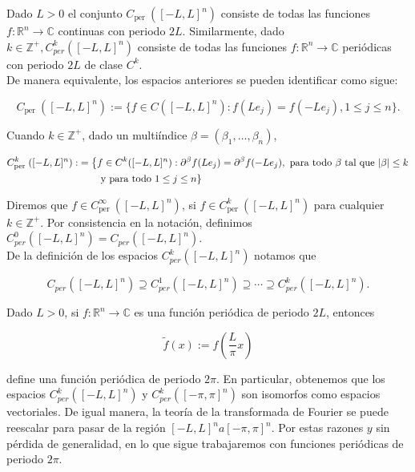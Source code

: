 \documentclass[12pt]{article}
\begin{document}
\begin{note}
    Dado $L>0$ el conjunto $C_{\text {per }}([-L, L]^n)$ consiste de todas las funciones $f: \mathbb{R}^n \rightarrow \mathbb{C}$ continuas con periodo $2L$. Similarmente, dado $k \in \mathbb{Z}^{+}, C_{p e r}^k([-L, L]^n)$ consiste de todas las funciones $f: \mathbb{R}^n \rightarrow \mathbb{C}$ periódicas con periodo $2 L$ de clase $C^k$.\\

De manera equivalente, los espacios anteriores se pueden identificar como sigue:

$$
C_{\text {per }}([-L, L]^n):=\{f \in C([-L, L]^n): f(Le_j)=f(-Le_j), 1\leq j\leq n\}.
$$


Cuando $k \in \mathbb{Z}^{+}$, dado un multiíndice $\beta=(\beta_1,\ldots,\beta_n)$,

\begin{align*}
    C_{\text {per }}^k([-L, L]^n):&=\left\{f \in C^k([-L, L]^n): \partial^{\beta}f(Le_j)=\partial^{\beta}f(-Le_j), \text{ para todo } \beta \text{ tal que } |\beta|\leq k\right. \\
    &\hspace{0.8cm} \text{y para todo } 1\leq j\leq n\}
\end{align*}

Diremos que $f \in C_{\text {per }}^{\infty}([-L, L]^n)$, si $f \in C_{\text {per }}^k([-L, L]^n)$ para cualquier $k \in \mathbb{Z}^{+}$. Por consistencia en la notación, definimos $C_{p e r}^0([-L, L]^n)=C_{p e r}([-L, L]^n)$.\\

De la definición de los espacios $C_{p e r}^k([-L, L]^n)$ notamos que

$$
C_{p e r}([-L, L]^n) \supseteq C_{p e r}^1([-L, L]^n) \supseteq \cdots \supseteq C_{p e r}^k([-L, L]^n).
$$

\end{note}

Dado $L>0$, si $f: \mathbb{R}^n \rightarrow \mathbb{C}$ es una función periódica de periodo $2 L$, entonces

$$
\widetilde{f}(x):=f\left(\frac{L}{\pi} x\right)
$$

define una función periódica de periodo $2 \pi$. En particular, obtenemos que los espacios $C_{p e r}^k([-L, L]^n)$ y $C_{p e r}^k([-\pi, \pi]^n)$ son isomorfos como espacios vectoriales. De igual manera, la teoría de la transformada de Fourier se puede reescalar para pasar de la región $[-L, L]^n a[-\pi, \pi]^n$. Por estas razones $y$ sin pérdida de generalidad, en lo que sigue trabajaremos con funciones periódicas de periodo $2 \pi$.\\
\end{document}
